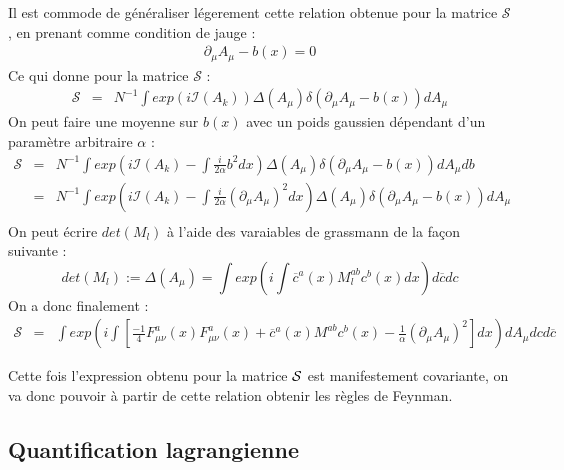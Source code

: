 \documentclass[a4paper,11pt]{article} %
\theoremstyle{plain}
\theoremstyle{definition}
\theoremstyle{remark}
\numberwithin{equation}{section}
\numberwithin{equation}{subsection}
\numberwithin{figure}{section}
\begin{document}
\noindent
Il est commode de généraliser légerement cette relation obtenue pour la matrice $\mathcal{S}$ , en prenant comme condition de jauge :
\begin{eqnarray*}
 \partial_{\mu}A_{\mu} - b(x) = 0
\end{eqnarray*}
Ce qui donne pour la matrice $\mathcal{S}$ : 
\begin{eqnarray*}
\mathcal{S} &=& N^{-1} \int exp\left( i \mathcal{I}(A_{k}) \right) \Delta(A_{\mu}) \delta \left(\partial_{\mu}A_{\mu} - b(x) \right) dA_{\mu}
\end{eqnarray*}
On peut faire une moyenne sur $b(x)$ avec un poids gaussien dépendant d'un paramètre arbitraire $\alpha$ : 
\begin{eqnarray*}
\mathcal{S} &=& N^{-1} \int exp\left( i \mathcal{I}(A_{k}) - \int \frac{i}{2\alpha} b^2  dx \right) \Delta(A_{\mu}) \delta \left(\partial_{\mu}A_{\mu} - b(x) \right) dA_{\mu} db \\
                      &=& N^{-1} \int exp\left( i \mathcal{I}(A_{k}) - \int \frac{i}{2\alpha} (\partial_{\mu}A_{\mu})^2  dx \right)
\Delta(A_{\mu}) \delta \left(\partial_{\mu}A_{\mu} - b(x) \right) dA_{\mu} \nonumber \\ 
\end{eqnarray*}
On peut écrire $det(M_{l})$ à l'aide des varaiables de grassmann de la façon suivante :
\begin{equation*}
 det(M_{l}) := \Delta(A_{\mu}) = \int exp \left(i \int \overline{c}^{a}(x)M_{l}^{ab}c^{b}(x) dx \right) d\overline{c} dc 
\end{equation*}
On a donc finalement :
\begin{eqnarray*}
 \mathcal{S} &=& \int exp\left(i \int \left[  
\frac{-1}{4} F^{a}_{\mu\nu}(x)F^{a}_{\mu \nu}(x) + \overline{c}^{a}(x)M^{ab}c^{b}(x) - \frac{1}{\alpha} (\partial_{\mu}A_{\mu})^2  
\right] dx \right) dA_{\mu} dc d\overline{c}
\end{eqnarray*}

\noindent
Cette fois l'expression obtenu pour la matrice $\cal{S}$ est manifestement covariante, on va donc pouvoir à partir de cette 
relation obtenir les règles de Feynman.

  \subsection{Quantification lagrangienne}
\end{document}
